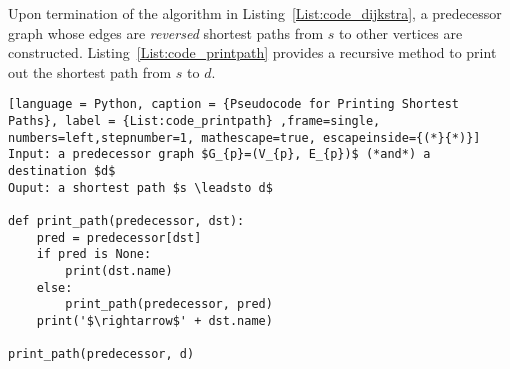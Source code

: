 Upon termination of the algorithm in Listing~\ref{List:code_dijkstra}, a predecessor graph whose edges are \emph{reversed} shortest paths from $s$ to other vertices are constructed. Listing~\ref{List:code_printpath} provides a recursive method to print out the shortest path from $s$ to $d$. 

\begin{lstlisting}[language = Python, caption = {Pseudocode for Printing Shortest Paths}, label = {List:code_printpath} ,frame=single, numbers=left,stepnumber=1, mathescape=true, escapeinside={(*}{*)}]
Input: a predecessor graph $G_{p}=(V_{p}, E_{p})$ (*and*) a destination $d$
Ouput: a shortest path $s \leadsto d$

def print_path(predecessor, dst):
    pred = predecessor[dst]
    if pred is None:
    	print(dst.name)
    else:
    	print_path(predecessor, pred)
	print('$\rightarrow$' + dst.name)
	
print_path(predecessor, d)
\end{lstlisting}
